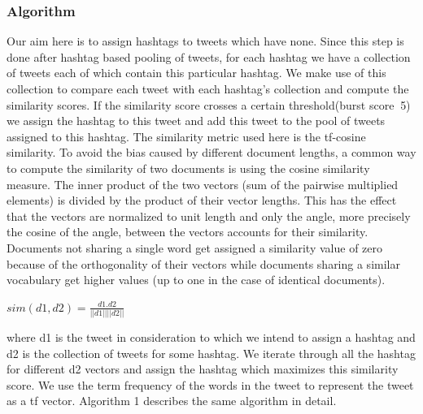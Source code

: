 \documentclass[10pt,a5paper,twoside]{article}
\begin{document}
\subsubsection{Algorithm}
Our aim here is to assign hashtags to tweets which have none. Since this step is done after hashtag based pooling of tweets, for each hashtag we have a collection of tweets each of which contain this particular hashtag. We make use of this collection to compare each tweet with each hashtag's collection and compute the similarity scores. If the similarity score crosses a certain threshold(burst score $\>$5) we assign the hashtag to this tweet and add this tweet to the pool of tweets assigned to this hashtag. The similarity metric used here is the tf-cosine similarity. To avoid the bias caused by different document lengths, a common way to compute the similarity of two documents is using the cosine similarity measure. The inner product of the two vectors (sum of the pairwise multiplied elements) is divided by the product of their vector lengths. This has the effect that the vectors are normalized to unit length and only the angle, more precisely the cosine of the angle, between the vectors accounts for their similarity. Documents not sharing a single word get assigned a similarity value of zero because of the orthogonality of their vectors while documents sharing a similar vocabulary get higher values (up to one in the case of identical documents).

\begin{center}
$sim(d1,d2) = \frac{d1 . d2}{||d1|| ||d2||}$
\end{center}

where d1 is the tweet in consideration to which we intend to assign a hashtag and d2 is the collection of tweets for some hashtag. We iterate through all the hashtag for different d2 vectors and assign the hashtag which maximizes this similarity score. We use the term frequency of the words in the tweet to represent the tweet as a tf vector. Algorithm 1 describes the same algorithm in detail.

\end{document}
